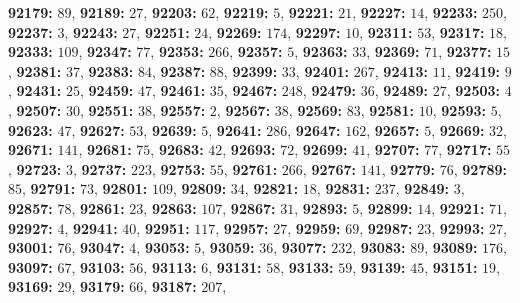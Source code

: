 \textsf{\bfseries 92179:} $89$, \textsf{\bfseries 92189:} $27$, \textsf{\bfseries 92203:} $62$, \textsf{\bfseries 92219:} $5$, \textsf{\bfseries 92221:} $21$, \textsf{\bfseries 92227:} $14$, \textsf{\bfseries 92233:} $250$, \textsf{\bfseries 92237:} $3$, \textsf{\bfseries 92243:} $27$, \textsf{\bfseries 92251:} $24$, \textsf{\bfseries 92269:} $174$, \textsf{\bfseries 92297:} $10$, \textsf{\bfseries 92311:} $53$, \textsf{\bfseries 92317:} $18$, \textsf{\bfseries 92333:} $109$, \textsf{\bfseries 92347:} $77$, \textsf{\bfseries 92353:} $266$, \textsf{\bfseries 92357:} $5$, \textsf{\bfseries 92363:} $33$, \textsf{\bfseries 92369:} $71$, \textsf{\bfseries 92377:} $15$, \textsf{\bfseries 92381:} $37$, \textsf{\bfseries 92383:} $84$, \textsf{\bfseries 92387:} $88$, \textsf{\bfseries 92399:} $33$, \textsf{\bfseries 92401:} $267$, \textsf{\bfseries 92413:} $11$, \textsf{\bfseries 92419:} $9$, \textsf{\bfseries 92431:} $25$, \textsf{\bfseries 92459:} $47$, \textsf{\bfseries 92461:} $35$, \textsf{\bfseries 92467:} $248$, \textsf{\bfseries 92479:} $36$, \textsf{\bfseries 92489:} $27$, \textsf{\bfseries 92503:} $4$, \textsf{\bfseries 92507:} $30$, \textsf{\bfseries 92551:} $38$, \textsf{\bfseries 92557:} $2$, \textsf{\bfseries 92567:} $38$, \textsf{\bfseries 92569:} $83$, \textsf{\bfseries 92581:} $10$, \textsf{\bfseries 92593:} $5$, \textsf{\bfseries 92623:} $47$, \textsf{\bfseries 92627:} $53$, \textsf{\bfseries 92639:} $5$, \textsf{\bfseries 92641:} $286$, \textsf{\bfseries 92647:} $162$, \textsf{\bfseries 92657:} $5$, \textsf{\bfseries 92669:} $32$, \textsf{\bfseries 92671:} $141$, \textsf{\bfseries 92681:} $75$, \textsf{\bfseries 92683:} $42$, \textsf{\bfseries 92693:} $72$, \textsf{\bfseries 92699:} $41$, \textsf{\bfseries 92707:} $77$, \textsf{\bfseries 92717:} $55$, \textsf{\bfseries 92723:} $3$, \textsf{\bfseries 92737:} $223$, \textsf{\bfseries 92753:} $55$, \textsf{\bfseries 92761:} $266$, \textsf{\bfseries 92767:} $141$, \textsf{\bfseries 92779:} $76$, \textsf{\bfseries 92789:} $85$, \textsf{\bfseries 92791:} $73$, \textsf{\bfseries 92801:} $109$, \textsf{\bfseries 92809:} $34$, \textsf{\bfseries 92821:} $18$, \textsf{\bfseries 92831:} $237$, \textsf{\bfseries 92849:} $3$, \textsf{\bfseries 92857:} $78$, \textsf{\bfseries 92861:} $23$, \textsf{\bfseries 92863:} $107$, \textsf{\bfseries 92867:} $31$, \textsf{\bfseries 92893:} $5$, \textsf{\bfseries 92899:} $14$, \textsf{\bfseries 92921:} $71$, \textsf{\bfseries 92927:} $4$, \textsf{\bfseries 92941:} $40$, \textsf{\bfseries 92951:} $117$, \textsf{\bfseries 92957:} $27$, \textsf{\bfseries 92959:} $69$, \textsf{\bfseries 92987:} $23$, \textsf{\bfseries 92993:} $27$, \textsf{\bfseries 93001:} $76$, \textsf{\bfseries 93047:} $4$, \textsf{\bfseries 93053:} $5$, \textsf{\bfseries 93059:} $36$, \textsf{\bfseries 93077:} $232$, \textsf{\bfseries 93083:} $89$, \textsf{\bfseries 93089:} $176$, \textsf{\bfseries 93097:} $67$, \textsf{\bfseries 93103:} $56$, \textsf{\bfseries 93113:} $6$, \textsf{\bfseries 93131:} $58$, \textsf{\bfseries 93133:} $59$, \textsf{\bfseries 93139:} $45$, \textsf{\bfseries 93151:} $19$, \textsf{\bfseries 93169:} $29$, \textsf{\bfseries 93179:} $66$, \textsf{\bfseries 93187:} $207$, 
